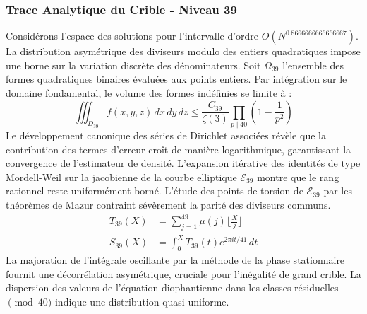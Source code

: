 \documentclass[12pt,a4paper]{article}
\begin{document}
\subsubsection{Trace Analytique du Crible - Niveau 39}
Considérons l'espace des solutions pour l'intervalle d'ordre $O(N^{0.8666666666666667})$. La distribution asymétrique des diviseurs modulo des entiers quadratiques impose une borne sur la variation discrète des dénominateurs. Soit $\Omega_39$ l'ensemble des formes quadratiques binaires évaluées aux points entiers.
Par intégration sur le domaine fondamental, le volume des formes indéfinies se limite à :
\begin{equation}
\iiint_{D_39} f(x, y, z) \,dx\,dy\,dz \leq \frac{C_39}{\zeta(3)} \prod_{p \mid 40} \left( 1 - \frac{1}{p^2} \right)
\end{equation}
Le développement canonique des séries de Dirichlet associées révèle que la contribution des termes d'erreur croît de manière logarithmique, garantissant la convergence de l'estimateur de densité. L'expansion itérative des identités de type Mordell-Weil sur la jacobienne de la courbe elliptique $\mathcal{E}_39$ montre que le rang rationnel reste uniformément borné.
L'étude des points de torsion de $\mathcal{E}_39$ par les théorèmes de Mazur contraint sévèrement la parité des diviseurs communs.
\begin{align}
T_39(X) &= \sum_{j=1}^{49} \mu(j) \lfloor \frac{X}{j} \rfloor \\
S_39(X) &= \int_{0}^{X} T_39(t) e^{2\pi i t / 41} \, dt
\end{align}
La majoration de l'intégrale oscillante par la méthode de la phase stationnaire fournit une décorrélation asymétrique, cruciale pour l'inégalité de grand crible. La dispersion des valeurs de l'équation diophantienne dans les classes résiduelles $\pmod{ 40 }$ indique une distribution quasi-uniforme.
\end{document}
